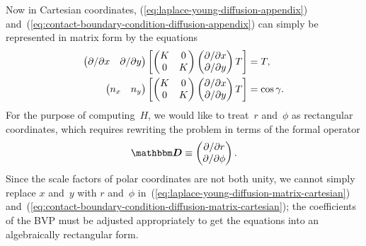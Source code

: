 Now in Cartesian coordinates,
(\ref{eq:laplace-young-diffusion-appendix})
and~(\ref{eq:contact-boundary-condition-diffusion-appendix})
can simply be represented in matrix form
by the equations
\begin{align}
  \begin{pmatrix}
    \pd / {\pd x} & \pd / {\pd y}
  \end{pmatrix}
  \squarebr*{
    \begin{pmatrix}
      K & 0 \\
      0 & K
    \end{pmatrix}
    \begin{pmatrix}
      \pd / {\pd x} \\
      \pd / {\pd y}
    \end{pmatrix}
    T
  }
    &= T,
    \label{eq:laplace-young-diffusion-matrix-cartesian} \\
  \begin{pmatrix}
    n_x & n_y
  \end{pmatrix}
  \squarebr*{
    \begin{pmatrix}
      K & 0 \\
      0 & K
    \end{pmatrix}
    \begin{pmatrix}
      \pd / {\pd x} \\
      \pd / {\pd y}
    \end{pmatrix}
    T
  }
    &= \cos\gamma.
    \label{eq:contact-boundary-condition-diffusion-matrix-cartesian}
\end{align}
For the purpose of computing~$H$,
we would like to treat~$r$ and~$\phi$ as rectangular coordinates,
which requires rewriting the problem in terms of the formal operator
\begin{equation}
  \matder \ideq
    \begin{pmatrix}
      \pd / {\pd r} \\
      \pd / {\pd\phi}
    \end{pmatrix}.
  \label{eq:small-formally-rectangular-derivative-appendix}
\end{equation}
Since the scale factors of polar coordinates are not both unity,
we cannot simply replace $x$ and~$y$ with $r$ and~$\phi$
in~(\ref{eq:laplace-young-diffusion-matrix-cartesian})
and~(\ref{eq:contact-boundary-condition-diffusion-matrix-cartesian});
the coefficients of the BVP must be adjusted appropriately
to get the equations into an algebraically rectangular form.
